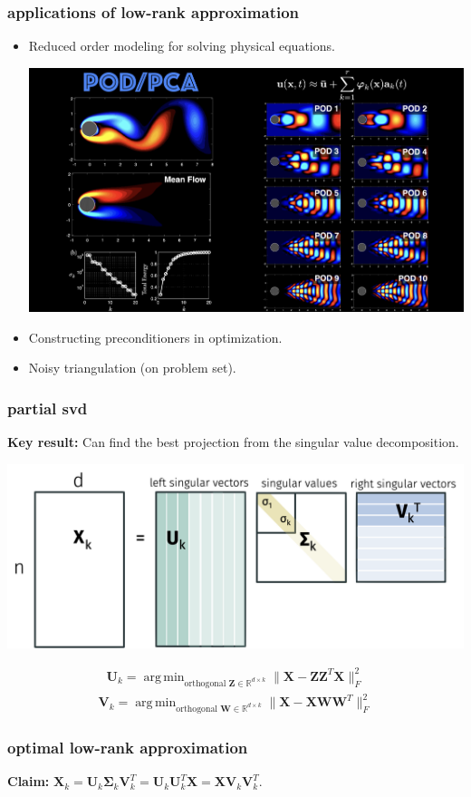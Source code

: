 \documentclass[compress]{beamer}
\newcommand{\bs}[1]{\boldsymbol{#1}}
\newcommand{\bv}[1]{\mathbf{#1}}
\newcommand{\R}{\mathbb{R}}
\DeclareMathOperator*{\argmin}{arg\,min}
\begin{document}
\begin{frame}
	\frametitle{applications of low-rank approximation}
		\begin{itemize}
		\item Reduced order modeling for solving physical equations.
		\begin{center}
			\includegraphics[width=.6\textwidth]{diffeq.jpg}
		\end{center}
		\item Constructing preconditioners in optimization.
		\item Noisy triangulation (on problem set).
	\end{itemize}
\end{frame}

\begin{frame}[t]
	\frametitle{partial svd}
	\textbf{Key result:} Can find the best projection from the singular value decomposition.
	\begin{center}
		\includegraphics[width=.9\textwidth]{svdk.png}
	\end{center} 
	\begin{align*}
		\bv{U}_k = 	\argmin_{\text{orthogonal }\bv{Z} \in \R^{d\times k}} \|\bv{X} - \bv{Z}\bv{Z}^T\bv{X}\|_F^2
		\end{align*}
	\begin{align*}
	\bv{V}_k = 	\argmin_{\text{orthogonal }\bv{W} \in \R^{d\times k}} \|\bv{X} - \bv{X}\bv{W}\bv{W}^T\|_F^2
	\end{align*}
\end{frame}

\begin{frame}[t]
	\frametitle{optimal low-rank approximation}
	\textbf{Claim:} $\bv{X}_k = \bv{U}_k\bs{\Sigma}_k\bv{V}_k^T = \bv{U}_k\bv{U}_k^T\bv{X}  = \bv{X} \bv{V}_k\bv{V}_k^T$. 
\end{frame}
\end{document}
